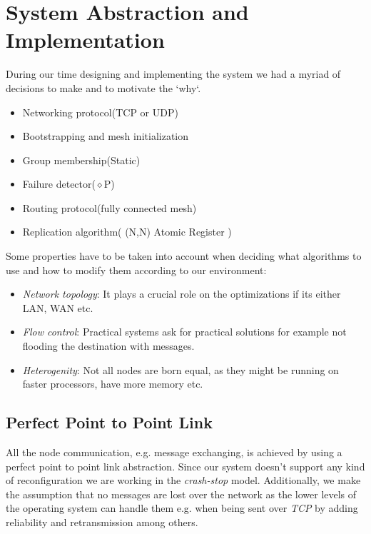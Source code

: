 \documentclass[a4paper, 11pt]{article}
\begin{document}
\section{System Abstraction and Implementation}

During our time designing and implementing the system we had a myriad of decisions to make and to motivate the `why`.

\begin{itemize}
	\item Networking protocol(TCP or UDP)
	\item Bootstrapping and mesh initialization
	\item Group membership(Static)
	\item Failure detector($\diamond$P)
	\item Routing protocol(fully connected mesh)
	\item Replication algorithm( (N,N) Atomic Register )
\end{itemize}

Some properties have to be taken into account when deciding what algorithms to use and how to modify them according to our environment:
\begin{itemize}
	\item \textit{Network topology}: It plays a crucial role on the optimizations if its either LAN, WAN etc.
	\item \textit{Flow control}: Practical systems ask for practical solutions for example not flooding the destination with messages.
	\item \textit{Heterogenity}: Not all nodes are born equal, as they might be running on faster processors, have more memory etc.
\end{itemize}

\subsection{Perfect Point to Point Link}

All the node communication, e.g. message exchanging, is achieved by using a perfect point to point link abstraction. Since our system doesn't support any kind of reconfiguration we are working in the \textit{crash-stop} model. Additionally, we make the assumption that no messages are lost over the network as the lower levels of the operating system can handle them e.g. when being sent over \textit{TCP} by adding reliability and retransmission among others. \par 
\end{document}
